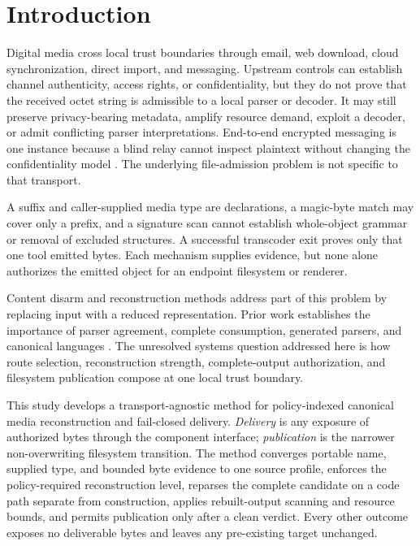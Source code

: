 \section{Introduction}
\label{sec:introduction}

Digital media cross local trust boundaries through email, web download, cloud
synchronization, direct import, and messaging. Upstream controls can establish
channel authenticity, access rights, or confidentiality, but they do not prove
that the received octet string is admissible to a local parser or decoder. It
may still preserve privacy-bearing metadata, amplify resource demand, exploit a
decoder, or admit conflicting parser interpretations. End-to-end encrypted
messaging is one instance because a blind relay cannot inspect plaintext
without changing the confidentiality model
\cite{unger2015,cohngordon2020,abelson2024}. The underlying file-admission
problem is not specific to that transport.

A suffix and caller-supplied media type are declarations, a magic-byte match
may cover only a prefix, and a signature scan cannot establish whole-object
grammar or removal of excluded structures. A successful transcoder exit proves
only that one tool emitted bytes. Each mechanism supplies evidence, but none
alone authorizes the emitted object for an endpoint filesystem or renderer.

Content disarm and reconstruction methods address part of this problem by
replacing input with a reduced representation. Prior work establishes the
importance of parser agreement, complete consumption, generated parsers, and
canonical languages \cite{samuel2012,jana2012,momot2016,nail2014,
everparse2019,ipg2023,darpaSafeDocs}. The unresolved systems question addressed
here is how route selection, reconstruction strength, complete-output
authorization, and filesystem publication compose at one local trust boundary.

This study develops a transport-agnostic method for policy-indexed canonical
media reconstruction and fail-closed delivery. \emph{Delivery} is any exposure
of authorized bytes through the component interface; \emph{publication} is the
narrower non-overwriting filesystem transition. The method converges portable
name, supplied type, and bounded byte evidence to one source profile, enforces
the policy-required reconstruction level, reparses the complete candidate on a
code path separate from construction, applies rebuilt-output scanning and
resource bounds, and permits publication only after a clean verdict. Every
other outcome exposes no deliverable bytes and leaves any pre-existing target
unchanged.

